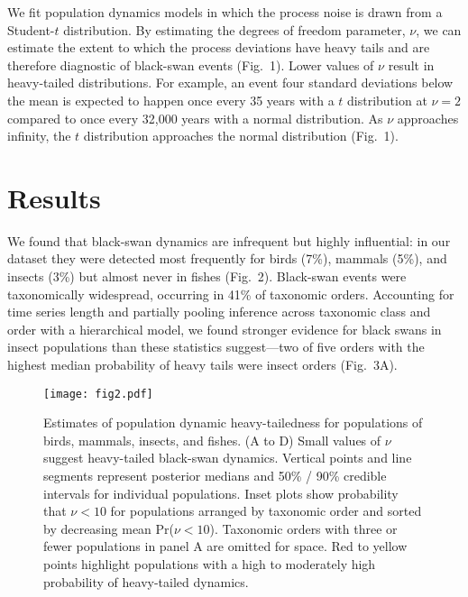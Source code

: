 \documentclass[9pt,twocolumn,twoside]{pnas-new}
\newcommand{\birdPH}{7}
\newcommand{\insectsPH}{3}
\newcommand{\mammalsPH}{5}
\newcommand{\POrdersHeavy}{41}
\begin{document}
We fit population dynamics models in which the process noise is
drawn from a Student-$t$ distribution. By estimating the degrees of freedom
parameter, \(\nu\), we can estimate the extent to which the process deviations
have heavy tails and are therefore diagnostic of black-swan events (Fig.~1).
Lower values of \(\nu\) result in heavy-tailed distributions.
For example, an event four standard deviations below the mean
is expected to happen once every 35 years with a $t$ distribution at \(\nu = 2\)
compared to once every 32,000 years with a normal distribution.
As \(\nu\) approaches infinity, the $t$
distribution approaches the normal distribution (Fig.~1).

\section*{Results}

We found that black-swan dynamics are infrequent but highly
influential: in our dataset they were detected most
frequently for birds (\birdPH\%), mammals (\mammalsPH\%), and
insects (\insectsPH\%) but almost never in fishes (Fig.~2). Black-swan
events were taxonomically widespread, occurring in \POrdersHeavy\% of taxonomic orders.
Accounting for time series length and partially pooling inference across
taxonomic class and order with a hierarchical model, we found stronger evidence
for black swans in insect populations than these statistics suggest---two of
five orders with the highest median probability of heavy tails were insect
orders (Fig.~3A).

\begin{figure}[htb]
\centering
\texttt{[image: fig2.pdf]}
\caption{Estimates of population dynamic heavy-tailedness for
populations of birds, mammals, insects, and fishes. (A to D)
Small values of \(\nu\) suggest heavy-tailed black-swan dynamics. Vertical
points and line segments represent posterior medians and 50\% / 90\% credible
intervals for individual populations. Inset plots show probability that \(\nu
< 10\) for populations arranged by taxonomic order and sorted by decreasing
mean Pr(\(\nu < 10\)). Taxonomic orders with three or fewer populations in
panel A are omitted for space. Red to yellow points highlight populations
with a high to moderately high probability of heavy-tailed dynamics.
}
\label{fig:2}
\end{figure}
\end{document}
